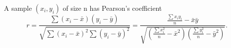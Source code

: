  A sample $(x_{i}, y_{i})$  of size n
has Pearson's coefficient
\[ r = \frac{\sum ( x_i - \bar{x} ) ( y_i - \bar{y} )}
{\sqrt{ \sum ( x_i - \bar{x} ) ^2 \sum ( y_i - \bar{y} ) ^2 } }
= \frac{ \frac{\sum x_i y_i }{n} - \bar{x} \bar{y} }
{ \sqrt { \left ( \frac{\sum x_i ^2 }{n} - \bar{x} ^2 \right )
\left ( \frac{\sum y_i ^2 }{n} - \bar{y} ^2 \right ) } } . \]
